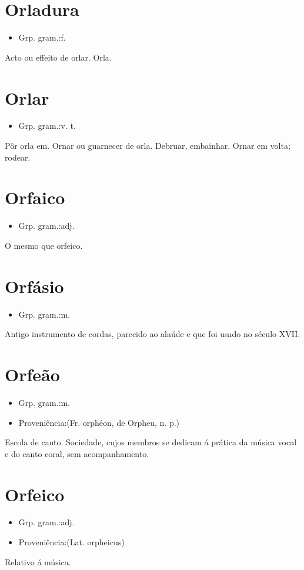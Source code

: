 \section{Orladura}
\begin{itemize}
\item {Grp. gram.:f.}
\end{itemize}
Acto ou effeito de orlar.
Orla.
\section{Orlar}
\begin{itemize}
\item {Grp. gram.:v. t.}
\end{itemize}
Pôr orla em.
Ornar ou guarnecer de orla.
Debruar, embainhar.
Ornar em volta; rodear.
\section{Orfaico}
\begin{itemize}
\item {Grp. gram.:adj.}
\end{itemize}
O mesmo que \textunderscore orfeico\textunderscore .
\section{Orfásio}
\begin{itemize}
\item {Grp. gram.:m.}
\end{itemize}
Antigo instrumento de cordas, parecido ao alaúde e que foi usado no século XVII.
\section{Orfeão}
\begin{itemize}
\item {Grp. gram.:m.}
\end{itemize}
\begin{itemize}
\item {Proveniência:(Fr. \textunderscore orphéon\textunderscore , de \textunderscore Orpheu\textunderscore , n. p.)}
\end{itemize}
Escola de canto.
Sociedade, cujos membros se dedicam á prática da música vocal e do canto coral, sem acompanhamento.
\section{Orfeico}
\begin{itemize}
\item {Grp. gram.:adj.}
\end{itemize}
\begin{itemize}
\item {Proveniência:(Lat. \textunderscore orpheicus\textunderscore )}
\end{itemize}
Relativo á música.
